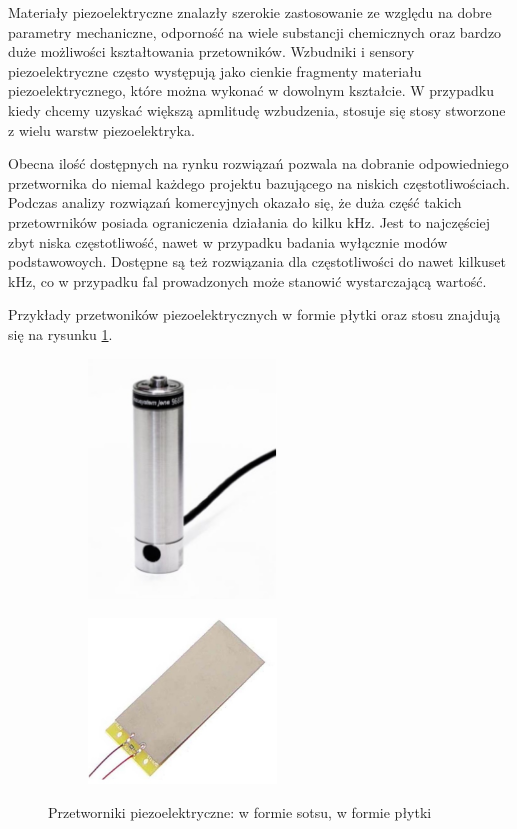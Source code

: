 Materiały piezoelektryczne znalazły szerokie zastosowanie ze względu na dobre parametry mechaniczne, odporność na wiele substancji chemicznych oraz bardzo duże możliwości kształtowania przetowników. Wzbudniki i sensory piezoelektryczne często występują jako cienkie fragmenty materiału piezoelektrycznego, które można wykonać w dowolnym kształcie. W przypadku kiedy chcemy uzyskać większą apmlitudę wzbudzenia, stosuje się stosy stworzone z wielu warstw piezoelektryka.

Obecna ilość dostępnych na rynku rozwiązań pozwala na dobranie odpowiedniego przetwornika do niemal każdego projektu bazującego na niskich częstotliwościach. Podczas analizy rozwiązań komercyjnych okazało się, że duża część takich przetowrników posiada ograniczenia działania do kilku kHz. Jest to najczęściej zbyt niska częstotliwość, nawet w przypadku badania wyłącznie modów podstawowoych. Dostępne są też rozwiązania dla częstotliwości do nawet kilkuset kHz, co w przypadku fal prowadzonych może stanowić wystarczającą wartość.

Przykłady przetwoników piezoelektrycznych w formie płytki oraz stosu znajdują się na rysunku \ref{fig:piezoelektryki}.

\begin{figure}[h]
        \centering
        \begin{subfigure}{0.35\textwidth}
                \centering
	     \includegraphics[width=5cm]{Zdjecia/2/piezo_stos}
                \subcaption{\label{subfigure_a}}
        \end{subfigure}
        \begin{subfigure}{0.35\textwidth}
                \centering
	     \includegraphics[width=5cm]{Zdjecia/2/piezo_plytka}
                \subcaption{\label{subfigure_b}}
        \end{subfigure}
        \caption{Przetworniki piezoelektryczne: \protect{} w formie sotsu, \protect{} w formie płytki}
        \label{fig:piezoelektryki}
\end{figure}

